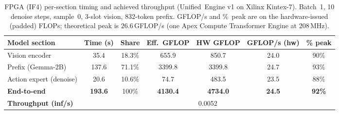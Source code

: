 \documentclass[11pt]{article}
\newcommand{\ue}{Unified~Engine}
\newcommand{\iffour}{IF4}
\begin{document}
\begin{table}[H]
\centering\small
\caption{FPGA (\iffour{}) per-section timing and achieved throughput
(\ue{} v1 on Xilinx Kintex-7). Batch~1, 10 denoise steps, sample~0, 3-slot
vision, 832-token prefix. GFLOP/s and \%~peak are on the hardware-issued
(padded) FLOPs; theoretical peak is $26.6$\,GFLOP/s (one Apex Compute
Transformer Engine at $208$\,MHz).}
\label{tab:timing-fpga}
\setlength{\tabcolsep}{4pt}
\begin{tabular}{@{}lcccccc@{}}
\toprule
\textbf{Model section} & \textbf{Time (s)} & \textbf{Share} & \textbf{Eff.\ GFLOP} & \textbf{HW GFLOP} & \textbf{GFLOP/s (hw)} & \textbf{\% peak} \\
\midrule
Vision encoder          & 35.4  & 18.3\% & 655.9  & 850.7  & 24.0 & 90\% \\
Prefix (Gemma-2B)       & 137.6 & 71.1\% & 3399.8 & 3399.8 & 24.7 & 93\% \\
Action expert (denoise) & 20.6  & 10.6\% & 74.7   & 483.5  & 23.5 & 88\% \\
\midrule
\textbf{End-to-end}     & \textbf{193.6} & 100\% & \textbf{4130.4} & \textbf{4734.0} & \textbf{24.5} & \textbf{92\%} \\
\textbf{Throughput (inf/s)} & \multicolumn{6}{c}{0.0052} \\
\bottomrule
\end{tabular}
\end{table}
\end{document}
